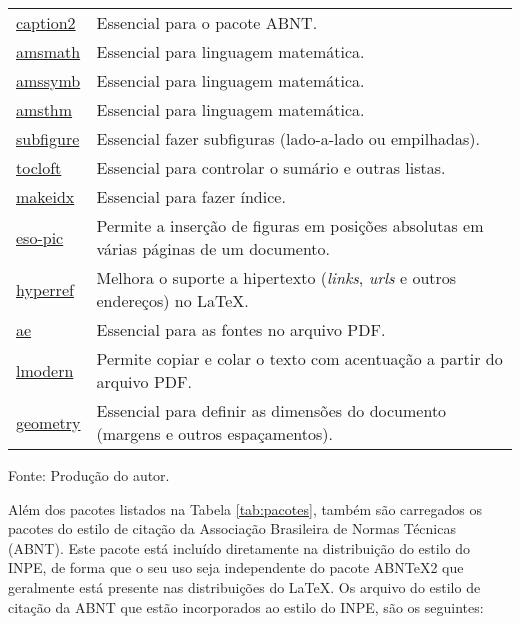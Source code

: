 \begin{longtable}{@{\extracolsep{\fill}}p{2cm} p{12cm}}
\href{https://www.ctan.org/pkg/caption2}{caption2} & Essencial para o pacote ABNT. \\
\href{https://www.ctan.org/pkg/amsmath}{amsmath} & Essencial para linguagem matemática. \\
\href{https://www.ctan.org/pkg/amsfonts}{amssymb} & Essencial para linguagem matemática. \\
\href{https://www.ctan.org/pkg/amsthm}{amsthm} & Essencial para linguagem matemática. \\
\href{https://www.ctan.org/pkg/subfigure}{subfigure} & Essencial fazer subfiguras (lado-a-lado ou empilhadas). \\
\href{https://www.ctan.org/pkg/tocloft}{tocloft} & Essencial para controlar o sumário e outras listas. \\
\href{https://www.ctan.org/pkg/makeidx}{makeidx} & Essencial para fazer índice. \\
\href{https://www.ctan.org/pkg/eso-pic}{eso-pic} & Permite a inserção de figuras em posições absolutas em várias páginas de um documento. \\
\href{https://www.ctan.org/pkg/hyperref}{hyperref} & Melhora o suporte a hipertexto (\textit{links}, \textit{urls} e outros endereços) no \LaTeX{}. \\
\href{https://www.ctan.org/pkg/ae}{ae} & Essencial para as fontes no arquivo PDF. \\
\href{https://www.ctan.org/tex-archive/info/lmodern}{lmodern} & Permite copiar e colar o texto com acentuação a partir do arquivo PDF. \\
\href{https://www.ctan.org/pkg/geometry}{geometry} & Essencial para definir as dimensões do documento (margens e outros espaçamentos). \\
\end{longtable}
\vspace{-8mm}
\begin{center}
	Fonte: Produção do autor.
\end{center}

Além dos pacotes listados na Tabela \ref{tab:pacotes}, também são carregados os pacotes do estilo de citação da Associação Brasileira de Normas Técnicas (ABNT). Este pacote está incluído diretamente na distribuição do estilo do INPE, de forma que o seu uso seja independente do pacote ABN\TeX{}2 que geralmente está presente nas distribuições do \LaTeX{}. Os arquivo do estilo de citação da ABNT que estão incorporados ao estilo do INPE, são os seguintes:

